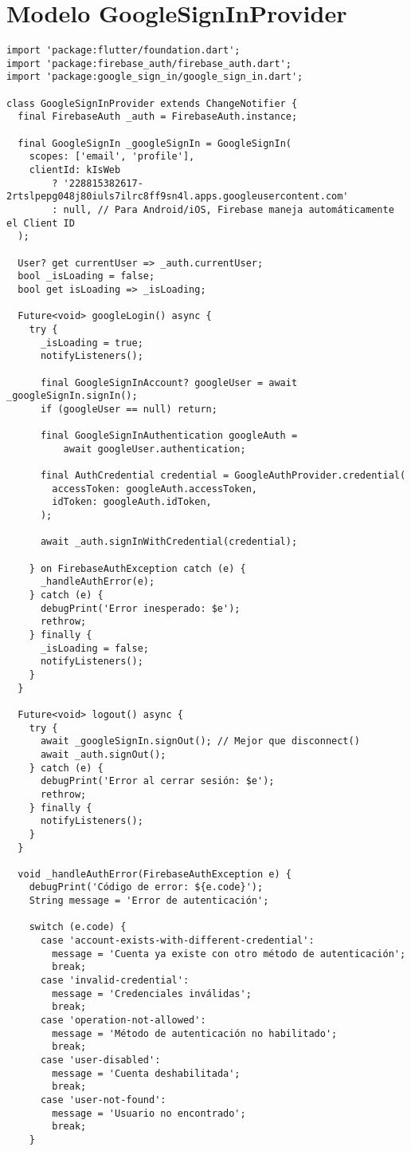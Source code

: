 \section{Modelo GoogleSignInProvider}
\label{anexo:alg9}
\begin{verbatim}
import 'package:flutter/foundation.dart';
import 'package:firebase_auth/firebase_auth.dart';
import 'package:google_sign_in/google_sign_in.dart';

class GoogleSignInProvider extends ChangeNotifier {
  final FirebaseAuth _auth = FirebaseAuth.instance;
  
  final GoogleSignIn _googleSignIn = GoogleSignIn(
    scopes: ['email', 'profile'],
    clientId: kIsWeb 
        ? '228815382617-2rtslpepg048j80iuls7ilrc8ff9sn4l.apps.googleusercontent.com'
        : null, // Para Android/iOS, Firebase maneja automáticamente el Client ID
  );

  User? get currentUser => _auth.currentUser;
  bool _isLoading = false;
  bool get isLoading => _isLoading;

  Future<void> googleLogin() async {
    try {
      _isLoading = true;
      notifyListeners();

      final GoogleSignInAccount? googleUser = await _googleSignIn.signIn();
      if (googleUser == null) return;

      final GoogleSignInAuthentication googleAuth = 
          await googleUser.authentication;

      final AuthCredential credential = GoogleAuthProvider.credential(
        accessToken: googleAuth.accessToken,
        idToken: googleAuth.idToken,
      );

      await _auth.signInWithCredential(credential);
      
    } on FirebaseAuthException catch (e) {
      _handleAuthError(e);
    } catch (e) {
      debugPrint('Error inesperado: $e');
      rethrow;
    } finally {
      _isLoading = false;
      notifyListeners();
    }
  }

  Future<void> logout() async {
    try {
      await _googleSignIn.signOut(); // Mejor que disconnect()
      await _auth.signOut();
    } catch (e) {
      debugPrint('Error al cerrar sesión: $e');
      rethrow;
    } finally {
      notifyListeners();
    }
  }

  void _handleAuthError(FirebaseAuthException e) {
    debugPrint('Código de error: ${e.code}');
    String message = 'Error de autenticación';

    switch (e.code) {
      case 'account-exists-with-different-credential':
        message = 'Cuenta ya existe con otro método de autenticación';
        break;
      case 'invalid-credential':
        message = 'Credenciales inválidas';
        break;
      case 'operation-not-allowed':
        message = 'Método de autenticación no habilitado';
        break;
      case 'user-disabled':
        message = 'Cuenta deshabilitada';
        break;
      case 'user-not-found':
        message = 'Usuario no encontrado';
        break;
    }


\end{verbatim}
